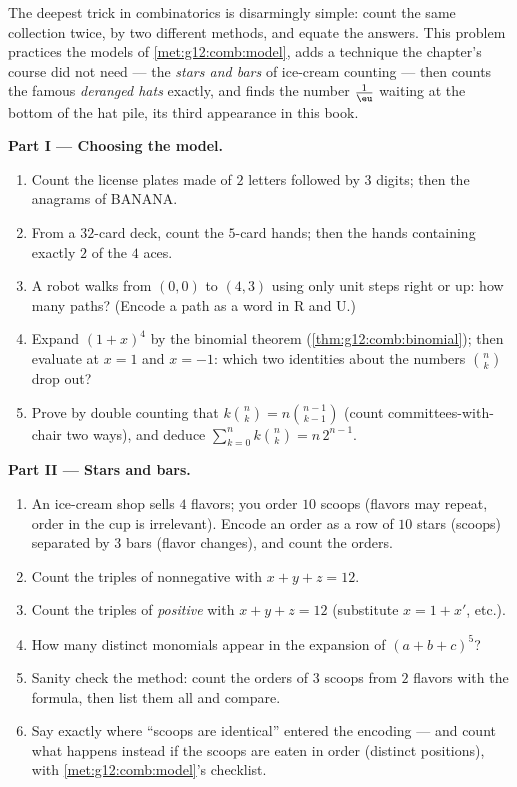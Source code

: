 \begin{problem}
\label{pb:g12:comb:1}
The deepest trick in combinatorics is disarmingly simple: count
the same collection twice, by two different methods, and equate
the answers. This problem practices the models of
\cref{met:g12:comb:model}, adds a technique the chapter's course
did not need --- the \emph{stars and bars} of ice-cream counting
--- then counts the famous \emph{deranged hats} exactly, and
finds the number $\frac1\eu$ waiting at the bottom of the hat
pile, its third appearance in this book.

\medskip
\noindent\textbf{Part I --- Choosing the model.}
\begin{enumerate}
  \item Count the license plates made of $2$ letters followed by
        $3$ digits; then the anagrams of BANANA.
  \item From a $32$-card deck, count the $5$-card hands; then
        the hands containing exactly $2$ of the $4$ aces.
  \item A robot walks from $(0,0)$ to $(4,3)$ using only unit
        steps right or up: how many paths? (Encode a path as a
        word in R and U.)
  \item Expand $(1 + x)^4$ by the binomial theorem
        (\cref{thm:g12:comb:binomial}); then evaluate at
        $x = 1$ and $x = -1$: which two identities about the
        numbers $\binom nk$ drop out?
  \item Prove by double counting that
        $k\binom nk = n\binom{n-1}{k-1}$ (count
        committees-with-chair two ways), and deduce
        $\sum_{k=0}^{n} k\binom nk = n\,2^{n-1}$.
\end{enumerate}

\medskip
\noindent\textbf{Part II --- Stars and bars.}
\begin{enumerate}[resume]
  \item An ice-cream shop sells $4$ flavors; you order $10$
        scoops (flavors may repeat, order in the cup is
        irrelevant). Encode an order as a row of $10$ stars
        (scoops) separated by $3$ bars (flavor changes), and
        count the orders.
  \item Count the triples of nonnegative  with
        $x + y + z = 12$.
  \item Count the triples of \emph{positive}  with
        $x + y + z = 12$ (substitute $x = 1 + x'$, etc.).
  \item How many distinct monomials appear in the expansion of
        $(a + b + c)^5$?
  \item Sanity check the method: count the orders of $3$
        scoops from $2$ flavors with the formula, then list
        them all and compare.
  \item Say exactly where ``scoops are identical'' entered the
        encoding --- and count what happens instead if the
        scoops are eaten in order (distinct positions), with
        \cref{met:g12:comb:model}'s checklist.
\end{enumerate}


\end{problem}

